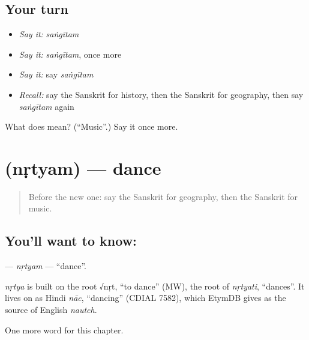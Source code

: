 \subsection*{Your turn}
\begin{itemize}
\raggedright
  \item \emph{Say it:} \emph{saṅgītam}
  \item \emph{Say it:} \emph{saṅgītam}, once more
  \item \emph{Say it:} say \emph{saṅgītam}
  \item \emph{Recall:} say the Sanskrit for history, then the Sanskrit for geography, then say \emph{saṅgītam} again
\end{itemize}

\begin{tcolorbox}[breakable,colback=teal!4,colframe=teal!35!black,title={Before you move on}]
What does  mean? (\textquotedblleft{}Music\textquotedblright{}.) Say it once more.
\end{tcolorbox}
\section[\texorpdfstring{\sk{नृत्यम्} (nṛtyam)}{नृत्यम् (nṛtyam)}]{ (nṛtyam) — dance}

\label{lesson:SA-C228-nrtyam}



\begin{quote}
Before the new one: say the Sanskrit for geography, then the Sanskrit for music.
\end{quote}

\subsection*{You'll want to know: }
\textbf{} — \emph{nṛtyam} — \textquotedblleft{}dance\textquotedblright{}.

\begin{cousinweb}
\emph{nṛtya} is built on the root √nṛt, \textquotedblleft{}to dance\textquotedblright{} (MW), the root of \emph{nṛtyati}, \textquotedblleft{}dances\textquotedblright{}. It lives on as Hindi \emph{nāc}, \textquotedblleft{}dancing\textquotedblright{} (CDIAL 7582), which EtymDB gives as the source of English \emph{nautch}.
\end{cousinweb}

\begin{grammarlens}[title={What you've built}]
One more word for this chapter.
\end{grammarlens}

